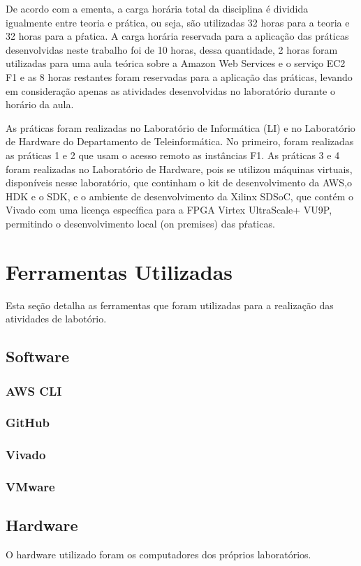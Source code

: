 De acordo com a ementa, a carga horária total da disciplina é dividida igualmente entre teoria e prática, ou seja, são utilizadas 32 horas para a teoria e 32 horas para a pŕatica. A carga horária reservada para a  aplicação das práticas desenvolvidas neste trabalho foi de 10 horas, dessa quantidade, 2 horas foram utilizadas para uma aula teórica sobre a Amazon Web Services e o serviço EC2 F1 e as 8 horas restantes foram reservadas para a aplicação das práticas, levando em consideração apenas as atividades desenvolvidas no laboratório durante o horário da aula.

As práticas foram realizadas no Laboratório de Informática (LI) e no Laboratório de Hardware do Departamento de Teleinformática. No primeiro, foram realizadas as práticas 1 e 2 que usam o acesso remoto as instâncias F1. As práticas 3 e 4 foram realizadas no Laboratório de Hardware, pois se utilizou máquinas virtuais, disponíveis nesse laboratório, que continham o kit de desenvolvimento da AWS,o HDK e o SDK, e o ambiente de desenvolvimento da Xilinx SDSoC, que contém o Vivado com uma licença específica para a FPGA Virtex UltraScale+ VU9P, permitindo  o desenvolvimento local (on premises) das pŕaticas.

\section{Ferramentas Utilizadas}\label{sec: ferramentas}

Esta seção detalha as ferramentas que foram utilizadas para a realização das atividades de labotório.

\subsection{Software}\label{sec: software}

\subsubsection{AWS CLI}\label{sec: aws-cli}


\subsubsection{GitHub}\label{sec: github}


\subsubsection{Vivado}\label{sec: vivado}

\subsubsection{VMware}\label{sec: vmware}


\subsection{Hardware}\label{sec: Hardware}

O hardware utilizado foram os computadores dos próprios laboratórios.